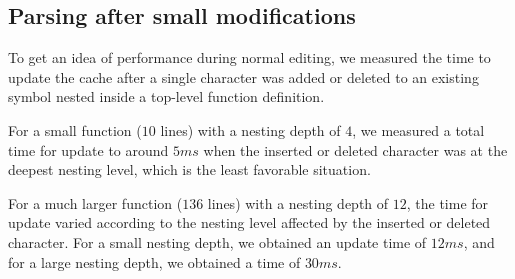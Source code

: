 \subsection{Parsing after small modifications}

To get an idea of performance during normal editing, we measured the
time to update the cache after a single character was added or deleted
to an existing symbol nested inside a top-level function definition.

For a small function ($10$ lines) with a nesting depth of $4$, we
measured a total time for update to around $5ms$ when the inserted or
deleted character was at the deepest nesting level, which is the least
favorable situation.

For a much larger function ($136$ lines) with a nesting depth of $12$,
the time for update varied according to the nesting level affected by
the inserted or deleted character.  For a small nesting depth, we
obtained an update time of $12ms$, and for a large nesting depth, we
obtained a time of $30ms$.
